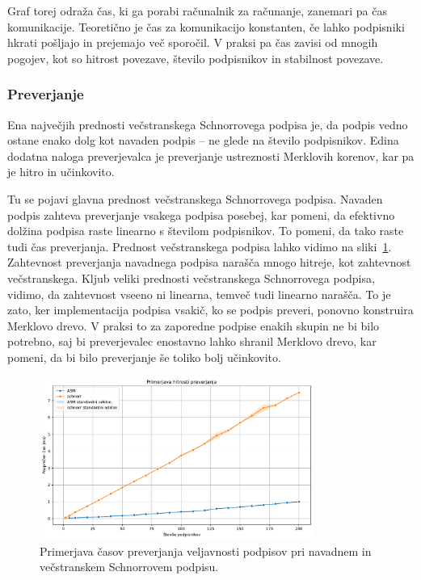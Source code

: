 \documentclass[isrm2, tisk]{fmfdelo}
\begin{document}
Graf torej odraža čas, ki ga porabi računalnik za računanje, zanemari pa čas komunikacije. Teoretično
je čas za komunikacijo konstanten, če lahko podpisniki hkrati pošljajo in prejemajo več sporočil.
V praksi pa čas zavisi od mnogih pogojev, kot so hitrost povezave, število podpisnikov in stabilnost
povezave.

\subsubsection{Preverjanje}
Ena največjih prednosti večstranskega Schnorrovega podpisa je, da podpis vedno ostane enako dolg kot
navaden podpis – ne glede na število podpisnikov. Edina dodatna naloga preverjevalca je preverjanje
ustreznosti Merklovih korenov, kar pa je hitro in učinkovito.

Tu se pojavi glavna prednost večstranskega Schnorrovega podpisa. Navaden podpis zahteva preverjanje
vsakega podpisa posebej, kar pomeni, da efektivno dolžina podpisa raste linearno s številom podpisnikov.
To pomeni, da tako raste tudi čas preverjanja. Prednost večstranskega podpisa lahko vidimo na
sliki~\ref{fig:preverjanje}. Zahtevnost preverjanja navadnega podpisa narašča mnogo hitreje, kot
zahtevnost večstranskega. Kljub veliki prednosti večstranskega Schnorrovega podpisa, vidimo, da
zahtevnost vseeno ni linearna, temveč tudi linearno narašča. To je zato, ker implementacija podpisa
vsakič, ko se podpis preveri, ponovno konstruira Merklovo drevo. V praksi to za zaporedne podpise
enakih skupin ne bi bilo potrebno, saj bi preverjevalec enostavno lahko shranil Merklovo drevo,
kar pomeni, da bi bilo preverjanje še toliko bolj učinkovito.

\begin{figure}[ht]
  \centering
  \includegraphics[width=0.8\textwidth]{images/benchmark_Verification.pdf}
  \caption[Preverjanje.]{Primerjava časov preverjanja veljavnosti podpisov pri navadnem in večstranskem
    Schnorrovem podpisu.}
  \label{fig:preverjanje}
\end{figure}
\end{document}
